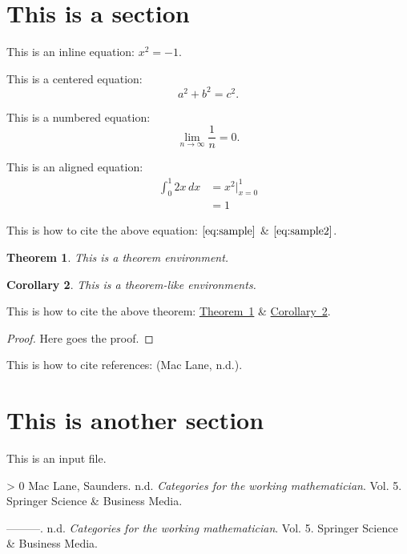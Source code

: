 \documentclass[
]{article}
\author{}
\date{}
\newlength{\cslhangindent}
\newenvironment{CSLReferences}[3] %
 {%
  \setlength{\parindent}{0pt}
  \ifodd #1 \everypar{\setlength{\hangindent}{\cslhangindent}}\ignorespaces\fi
  \ifnum #2 > 0
  \setlength{\parskip}{#2\baselineskip}
  \fi
 }%
 {}
\begin{document}
{
\setcounter{tocdepth}{3}
\tableofcontents
}
\hypertarget{this-is-a-section}{%
\section{This is a section}\label{this-is-a-section}}

This is an inline equation: \(x^2=-1\).

This is a centered equation: \[a^2+b^2=c^2.\]

This is a numbered equation: \begin{equation}
\lim_{n\to\infty}\frac{1}{n}=0.
\label{eq:sample}
\end{equation}

This is an aligned equation: \begin{align}
    \int_{0}^{1}2x\,dx 
    &=x^2\Big|_{x=0}^1\label{eq:sample2}\\
    &=1
\end{align}

This is how to cite the above equation: \(\eqref{eq:sample}\) \&
\(\eqref{eq:sample2}\).

\leavevmode\hypertarget{thm:sample}{}%
\textbf{Theorem 1}. \emph{This is a theorem environment.}

\leavevmode\hypertarget{corollary}{}%
\textbf{Corollary 2}. \emph{This is a theorem-like environments.}

This is how to cite the above theorem:
\protect\hyperlink{thm:sample}{Theorem~1} \&
\protect\hyperlink{corollary}{Corollary~2}.

\emph{Proof.} Here goes the proof.~◻

This is how to cite references: (Mac Lane, n.d.).

\hypertarget{this-is-another-section}{%
\section{This is another section}\label{this-is-another-section}}

This is an input file.

\hypertarget{refs}{}
\begin{CSLReferences}{1}{0}
\leavevmode\hypertarget{ref-mac2013categories}{}%
Mac Lane, Saunders. n.d. \emph{{Categories for the working
mathematician}}. Vol. 5. Springer Science \& Business Media.

\leavevmode\hypertarget{ref-mac2013categories}{}%
---------. n.d. \emph{{Categories for the working mathematician}}. Vol.
5. Springer Science \& Business Media.

\end{CSLReferences}
\end{document}
